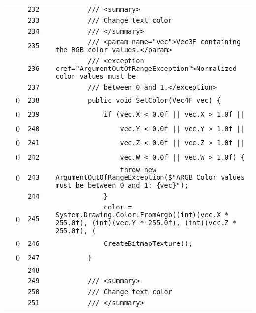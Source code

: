 \documentclass[a4paper,landscape,10pt]{article}
\begin{document}
\begin{longtable}[l]{lrrll}
\cellcolor{gray} &  & \verb~232~ & & \verb~        /// <summary>~\\
\cellcolor{gray} &  & \verb~233~ & & \verb~        /// Change text color~\\
\cellcolor{gray} &  & \verb~234~ & & \verb~        /// </summary>~\\
\cellcolor{gray} &  & \verb~235~ & & \verb~        /// <param name="vec">Vec3F containing the RGB color values.</param>~\\
\cellcolor{gray} &  & \verb~236~ & & \verb~        /// <exception cref="ArgumentOutOfRangeException">Normalized color values must be~\\
\cellcolor{gray} &  & \verb~237~ & & \verb~        /// between 0 and 1.</exception>~\\
\cellcolor{red} & 0 & \verb~238~ & & \verb~        public void SetColor(Vec4F vec) {~\\
\cellcolor{red} & 0 & \verb~239~ & & \verb~            if (vec.X < 0.0f || vec.X > 1.0f ||~\\
\cellcolor{red} & 0 & \verb~240~ & & \verb~                vec.Y < 0.0f || vec.Y > 1.0f ||~\\
\cellcolor{red} & 0 & \verb~241~ & & \verb~                vec.Z < 0.0f || vec.Z > 1.0f ||~\\
\cellcolor{red} & 0 & \verb~242~ & & \verb~                vec.W < 0.0f || vec.W > 1.0f) {~\\
\cellcolor{red} & 0 & \verb~243~ & & \verb~                throw new ArgumentOutOfRangeException($"ARGB Color values must be between 0 and 1: {vec}");~\\
\cellcolor{gray} &  & \verb~244~ & & \verb~            }~\\
\cellcolor{red} & 0 & \verb~245~ & & \verb~            color = System.Drawing.Color.FromArgb((int)(vec.X * 255.0f), (int)(vec.Y * 255.0f), (int)(vec.Z * 255.0f), (~\\
\cellcolor{red} & 0 & \verb~246~ & & \verb~            CreateBitmapTexture();~\\
\cellcolor{red} & 0 & \verb~247~ & & \verb~        }~\\
\cellcolor{gray} &  & \verb~248~ & & \verb~~\\
\cellcolor{gray} &  & \verb~249~ & & \verb~        /// <summary>~\\
\cellcolor{gray} &  & \verb~250~ & & \verb~        /// Change text color~\\
\cellcolor{gray} &  & \verb~251~ & & \verb~        /// </summary>~\\

\end{longtable}
\end{document}
